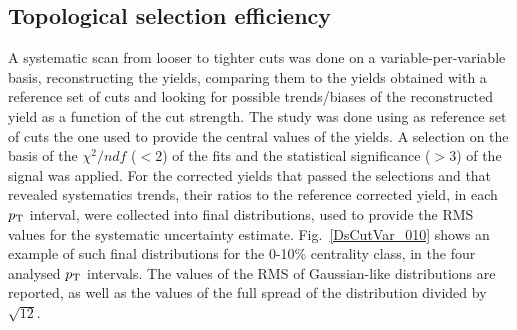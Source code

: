 \subsection{Topological selection efficiency}
\label{sec:CutVarsystAA}
A systematic scan from looser to tighter cuts was done on a variable-per-variable 
basis, reconstructing the yields, comparing them to the yields obtained 
with a reference set of cuts and looking for possible trends/biases of 
the reconstructed yield as a function of the cut strength.
The study was done using as reference set of cuts the one used 
to provide the central values of the yields. A selection
on the basis of the $\chi^2/ndf$ ($<2$) of the fits and the statistical significance ($>3$)
of the signal was applied. For the corrected yields that passed the selections
and that revealed systematics trends, their ratios to the reference corrected
yield, in each $p_{\rm T}$ interval, were collected
into final distributions, used to provide the RMS values 
for the systematic uncertainty estimate. 
Fig.~\ref{DsCutVar_010} shows an example of such final distributions 
for the 0-10\% centrality class, in the four analysed $p_{\rm T}$ intervals. 
The values of the RMS of Gaussian-like distributions are reported, as well as
the values of the full spread of the distribution divided by $\sqrt{12}$.

